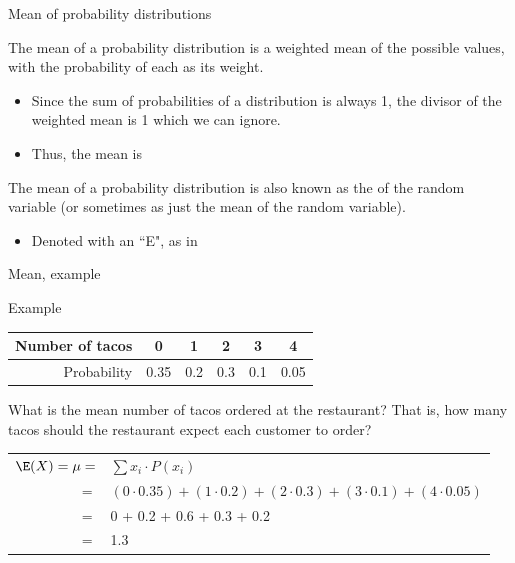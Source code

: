 \documentclass[xcolor=table, aspectratio=169, bigger]{beamer}
\begin{document}
\begin{frame}{Mean of probability distributions}
\begin{block}{}
The mean of a probability distribution is a weighted mean of the possible values, with the probability of each as its weight. 

\begin{itemize}
\pause\item Since the sum of probabilities of a distribution is always 1, the divisor of the weighted mean is 1 which we can ignore.
\pause\item Thus, the mean is\\ \smallskip
{}
\end{itemize}
\medskip
\pause
The mean of a probability distribution is also known as the  of the random variable (or sometimes as just the mean of the random variable).
\begin{itemize}
\item Denoted with an ``E", as in \\ \smallskip
{}
\end{itemize}
\smallskip
\end{block}
\end{frame}

\begin{frame}{Mean, example}
\begin{exampleblock}{Example}
{\centering \tabspacemed
\begin{tabular}{r | c cccc}
Number of tacos & 0 & 1 & 2 & 3 & 4\\
\hline
Probability &  0.35 & 0.2 & 0.3 & 0.1 & 0.05
\end{tabular}\par
}
\bigskip

What is the mean number of tacos ordered at the restaurant? That is, how many tacos should the restaurant expect each customer to order?\\
\medskip
\pause
{\centering 
\begin{tabular}{r l}
$\E(X) = \mu =$ & $\sum x_i \cdot P(x_i)$\\
$=$ & $(0 \cdot 0.35) + (1 \cdot 0.2) + (2 \cdot 0.3) + (3 \cdot 0.1)+ (4 \cdot 0.05)$\\
$=$ & 0 + 0.2 + 0.6 + 0.3 + 0.2\\
$=$ & 1.3
\end{tabular}\par
\renewcommand{\arraystretch}{1.5}}

\end{exampleblock}
\end{frame}
\end{document}
